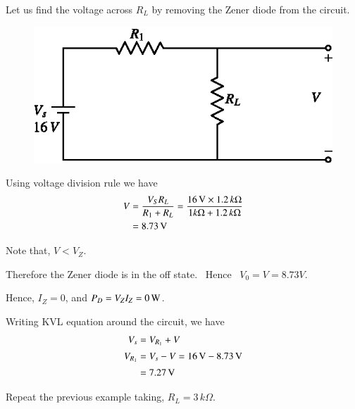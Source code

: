 \begin{solution}
Let us find the voltage across $R_{L}$ by removing the Zener diode from the circuit.
\begin{figure}[H]
\centering
\includegraphics{chap2/sol2.30.eps}
\end{figure}

Using voltage division rule we have
\begin{align*}
V &= \dfrac{V_{S}R_{L}}{R_{1}+R_{L}}=\dfrac{16\text{\,V}\times 1.2\, k\Omega}{1k\Omega+1.2\,k\Omega}\\
&= 8.73\text{\,V}
\end{align*}

Note that, $V<V_{Z}$.

Therefore the Zener diode is in the off state. \ Hence \ $V_{0}=V=8.73V$.

Hence, $I_{Z}=0$, and $P_{D}=V_{Z}I_{Z}=0\text{\,W}$.

Writing KVL equation around the circuit, we have
\begin{align*}
V_{s} &= V_{R_{1}}+V\\[2pt]
V_{R_{1}} &= V_{s}-V=16\text{\,V}-8.73\text{\,V}\\[2pt]
&= 7.27\text{\,V}
\end{align*}
\vskip -1cm
\end{solution}

\begin{example}\label{exam2.33}
Repeat the previous example taking, $R_{L}=3\,k\Omega$.
\end{example}

